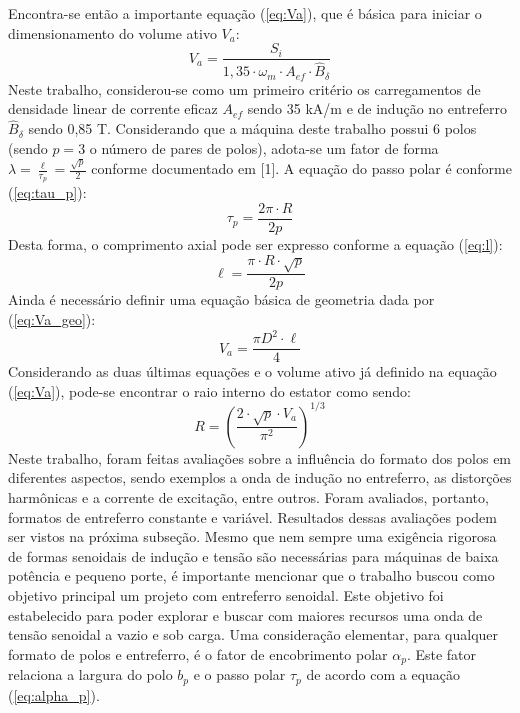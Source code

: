 \documentclass[conference]{IEEEtran}
\begin{document}
Encontra-se então a importante equação (\ref{eq:Va}), que é básica para iniciar o dimensionamento do volume ativo $V_a$:
\begin{equation}
  V_a = \frac{S_i}{1,35 \cdot \omega_m \cdot A_{ef} \cdot \hat{B}_\delta}
\label{eq:Va}
\end{equation}
Neste trabalho, considerou-se como um primeiro critério os carregamentos de densidade linear de corrente eficaz $A_{ef}$ sendo 35 kA/m e de indução no entreferro $\hat{B}_\delta$ sendo 0,85 T.  
Considerando que a máquina deste trabalho possui 6 polos (sendo $p=3$ o número de pares de polos), adota-se um fator de forma $\lambda = \frac{\ell}{\tau_p} = \frac{\sqrt{p}}{2}$ conforme documentado em [1]. 
A equação do passo polar é conforme (\ref{eq:tau_p}):
\begin{equation}
\tau_p = \frac{2\pi \cdot R}{2p}
\label{eq:tau_p}
\end{equation}
Desta forma, o comprimento axial pode ser expresso conforme a equação (\ref{eq:l}):
\begin{equation}
  \ell = \frac{\pi \cdot R \cdot \sqrt{p}}{2p}
\label{eq:l}
\end{equation}
Ainda é necessário definir uma equação básica de geometria dada por (\ref{eq:Va_geo}): 
\begin{equation}
  V_a = \frac{\pi D^2 \cdot \ell}{4}
\label{eq:Va_geo}
\end{equation}
Considerando as duas últimas equações e o volume ativo já definido na equação (\ref{eq:Va}), pode-se encontrar o raio interno do estator como sendo:
\begin{equation}
  R = \left(\frac{2 \cdot \sqrt{p} \cdot V_a}{\pi^2}\right)^{1/3}
\label{eq:R}
\end{equation}
Neste trabalho, foram feitas avaliações sobre a influência do formato dos polos em diferentes aspectos, sendo exemplos a onda de indução no entreferro, as distorções harmônicas e a corrente de excitação, entre outros. Foram avaliados, portanto, formatos de entreferro constante e variável. Resultados dessas avaliações podem ser vistos na próxima subseção. Mesmo que nem sempre uma exigência rigorosa de formas senoidais de indução e tensão são necessárias para máquinas de baixa potência e pequeno porte, é importante mencionar que o trabalho buscou como objetivo principal um projeto com entreferro senoidal. Este objetivo foi estabelecido para poder explorar e buscar com maiores recursos uma onda de tensão senoidal a vazio e sob carga. Uma consideração elementar, para qualquer formato de polos e entreferro, é o fator de encobrimento polar $\alpha_p$. Este fator relaciona a largura do polo $b_p$ e o passo polar $\tau_p$ de acordo com a equação (\ref{eq:alpha_p}). 
\end{document}
